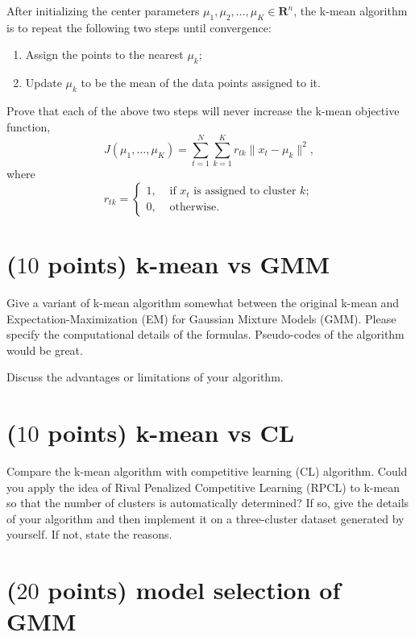 \documentclass{article}
\begin{document}
After initializing the center parameters $\mu_1,\mu_2,\ldots,\mu_K\in\mathbf{R}^n$, the k-mean algorithm is to repeat the following two steps until convergence:
\begin{enumerate}
    \item Assign the points to the nearest $\mu_k$;
    \item Update $\mu_k$ to be the mean of the data points assigned to it.
\end{enumerate}
Prove that each of the above two steps will never increase the k-mean objective function, 
\begin{equation}
    J(\mu_1,\ldots,\mu_K)=\sum_{t=1}^N\sum_{k=1}^K r_{tk}\|x_t-\mu_k\|^2,
\end{equation}
where 
\begin{equation}
    r_{tk} = \left\{ \begin{array}{cc}
        1, & \text{ if } x_t \text{ is assigned to cluster } k; \\ %
        0, & \text{ otherwise. }
    \end{array} \right.
\end{equation}


\section{($10$ points) k-mean vs GMM}

Give a variant of k-mean algorithm somewhat between the original k-mean and Expectation-Maximization (EM) for Gaussian Mixture Models (GMM). Please specify the computational details of the formulas. Pseudo-codes of the algorithm would be great.

Discuss the advantages or limitations of your algorithm.


\section{($10$ points) k-mean vs CL}

Compare the k-mean algorithm with competitive learning (CL) algorithm. Could you apply the idea of Rival Penalized Competitive Learning (RPCL) to k-mean so that the number of clusters is automatically determined? If so, give the details of your algorithm and then implement it on a three-cluster dataset generated by yourself. If not, state the reasons.


\section{($20$ points) model selection of GMM}
\end{document}
